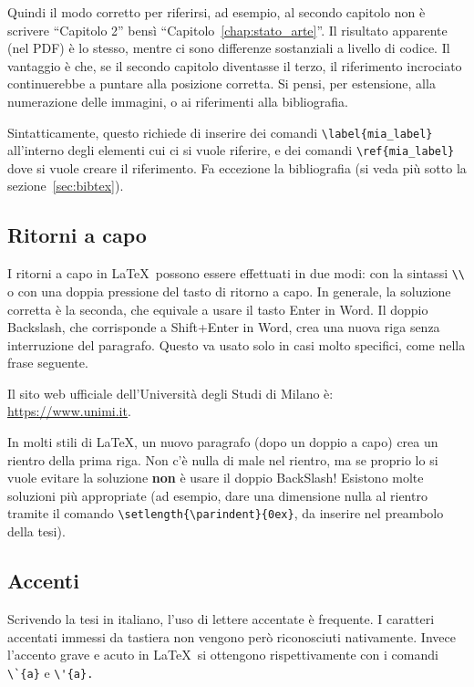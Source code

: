 \documentclass[12pt]{report}
\begin{document}
Quindi il modo corretto per riferirsi, ad esempio, al secondo capitolo non è scrivere ``Capitolo 2'' bensì ``Capitolo~\ref{chap:stato_arte}''. Il risultato apparente (nel PDF) è lo stesso, mentre ci sono differenze sostanziali a livello di codice. Il vantaggio è che, se il secondo capitolo diventasse il terzo, il riferimento incrociato continuerebbe a puntare alla posizione corretta. Si pensi, per estensione, alla numerazione delle immagini, o ai riferimenti alla bibliografia.

Sintatticamente, questo richiede di inserire dei comandi \verb|\label{mia_label}| all'interno degli elementi cui ci si vuole riferire, e dei comandi \verb|\ref{mia_label}| dove si vuole creare il riferimento. Fa eccezione la bibliografia (si veda pi\`u sotto la sezione~\ref{sec:bibtex}).


\subsection{Ritorni a capo}

I ritorni a capo in \LaTeX\ possono essere effettuati in due modi: con la sintassi \verb|\\| o con una doppia pressione del tasto di ritorno a capo. In generale, la soluzione corretta è la seconda, che equivale a usare il tasto Enter in Word. Il doppio Backslash, che corrisponde a Shift+Enter in Word, crea una nuova riga senza interruzione del paragrafo. Questo va usato solo in casi molto specifici, come nella frase seguente.

Il sito web ufficiale dell'Università degli Studi di Milano è:\\
\url{https://www.unimi.it}.

In molti stili di \LaTeX, un nuovo paragrafo (dopo un doppio a capo) crea un rientro della prima riga. Non c'\`e nulla di male nel rientro, ma se proprio lo si vuole evitare la soluzione \textbf{non} \`e usare il doppio BackSlash! Esistono molte soluzioni pi\`u appropriate (ad esempio, dare una dimensione nulla al rientro tramite il comando \verb|\setlength{\parindent}{0ex}|, da inserire nel preambolo della tesi).

\subsection{Accenti}

Scrivendo la tesi in italiano, l'uso di lettere accentate \`e frequente. I caratteri accentati immessi da tastiera non vengono per\`o riconosciuti nativamente. Invece l'accento grave e acuto in \LaTeX\ si ottengono rispettivamente con i comandi \verb|\`{a}| e \verb|\'{a}.|
\end{document}
